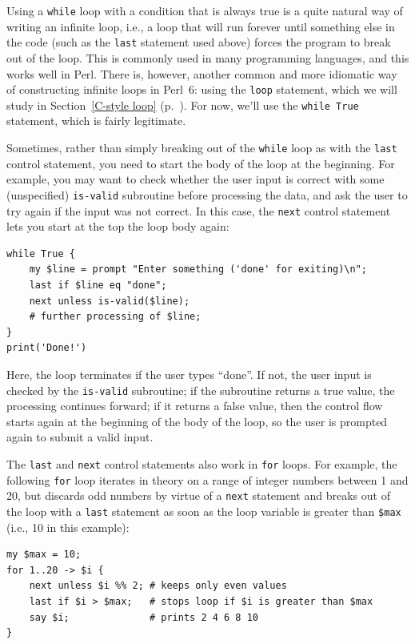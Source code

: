Using a {\tt while} loop with a condition that is always true 
is a quite natural way of writing an infinite loop, i.e., a 
loop that will run forever until something else in the code 
(such as the {\tt last} statement used above) forces the 
program to break out of the loop. This is commonly used in 
many programming languages, and this works well in Perl. There 
is, however, another common and more idiomatic way of constructing 
infinite loops in Perl~6: using the {\tt loop} statement, 
which we will study in Section~\ref{C-style loop} 
(p.~\pageref{C-style loop}). For now, we'll use the {\tt while True} 
statement, which is fairly legitimate.

Sometimes, rather than simply breaking out of the {\tt while}  loop 
as with the {\tt last} control statement, you need to start the 
body of the loop at the beginning. For example, you may want 
to check whether the user input is correct with some 
(unspecified) {\tt is-valid} subroutine before processing 
the data, and ask the user to try again if the input was not 
correct. In this case, the {\tt next} control statement lets 
you start at the top the loop body again:

\begin{verbatim}
while True {
    my $line = prompt "Enter something ('done' for exiting)\n";
    last if $line eq "done";
    next unless is-valid($line);
    # further processing of $line;
}
print('Done!')
\end{verbatim}
%
Here, the loop terminates if the user types ``done''. If not, the user input is checked by the {\tt is-valid} subroutine; if the subroutine returns a true value, the processing continues forward; if it returns a false value, then the control flow starts again at the beginning of the body of the loop, so the user is prompted again to submit a valid input.

The {\tt last} and {\tt next} control statements also work in 
{\tt for} loops. For example, the following {\tt for} loop 
iterates in theory on a range of integer numbers between 1 and 20, 
but discards odd numbers by virtue of a {\tt next} statement 
and breaks out of the loop with a {\tt last} statement as 
soon as the loop variable is greater than {\tt \$max} (i.e., 10 in this  example):

\begin{verbatim}
my $max = 10;
for 1..20 -> $i {
    next unless $i %% 2; # keeps only even values
    last if $i > $max;   # stops loop if $i is greater than $max
    say $i;              # prints 2 4 6 8 10
}
\end{verbatim}

